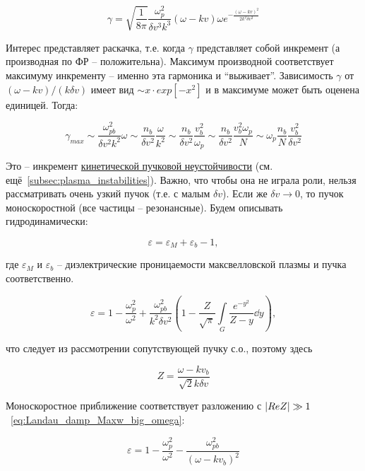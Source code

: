 \documentclass[10pt, a4paper]{article}
\begin{document}
\begin{equation*}
	\gamma = \sqrt{\frac{1}{8\pi}}\frac{\omega_p^2}{\delta v^3k^3}(\omega-kv)\omega e^{-\frac{(\omega-kv)^2}{2k^2\delta v^2}}
\end{equation*}

Интерес представляет раскачка, т.е. когда $\gamma$ представляет собой инкремент (а производная по ФР -- положительна). Максимум производной соответствует максимуму инкременту -- именно эта гармоника и ``выживает''.
Зависимость $\gamma$ от $(\omega-kv)/(k\delta v)$ имеет вид $\sim x\cdot exp[-x^2]$ и в максимуме может быть оценена единицей. Тогда:

\begin{equation*}
	\gamma_{max} \sim \frac{\omega_{pb}^2}{\delta v^2k^2}\omega\sim \frac{n_b}{\delta v^2}\frac{\omega}{k^2}\sim\frac{n_b}{\delta v^2}\frac{v_b^2}{\omega_p}\sim\frac{n_b}{\delta v^2}\frac{v_b^2\omega_p}{N} \sim \omega_p\frac{n_b}{N}\frac{v_b^2}{\delta v^2}
\end{equation*}

Это -- инкремент \uline{кинетической пучковой неустойчивости} (см. ещё~\ref{subsec:plasma_instabilities}). Важно, что чтобы она не играла роли, нельзя рассматривать очень узкий пучок (т.е. с малым $\delta v$). Если же $\delta v\rightarrow 0$, то пучок моноскоростной (все частицы -- резонансные). Будем описывать гидродинамически:

\begin{equation*}
	\varepsilon = \varepsilon_M + \varepsilon_b - 1,
\end{equation*}

где $\varepsilon_M$ и $\varepsilon_b$ -- диэлектрические проницаемости максвелловской плазмы и пучка соответственно.

\begin{equation*}
	\varepsilon = 1 - \frac{\omega_p^2}{\omega^2} + \frac{\omega_{pb}^2}{k^2\delta v^2}\left(1-\frac{Z}{\sqrt{\pi}} \int\limits_G \frac{e^{-y^2}}{Z-y}\dd{y}\right),
\end{equation*}

что следует из рассмотрении сопутствующей пучку с.о., поэтому здесь

\begin{equation*}
	Z = \frac{\omega-kv_b}{\sqrt{2}k\delta v}
\end{equation*}

Моноскоростное приближение соответствует разложению с $\abs{ReZ}\gg 1$~\eqref{eq:Landau_damp_Maxw_big_omega}:

\begin{equation*}
	\varepsilon = 1 - \frac{\omega_p^2}{\omega^2} - \frac{\omega_{pb}^2}{(\omega-kv_b)^2}
\end{equation*}
\end{document}
